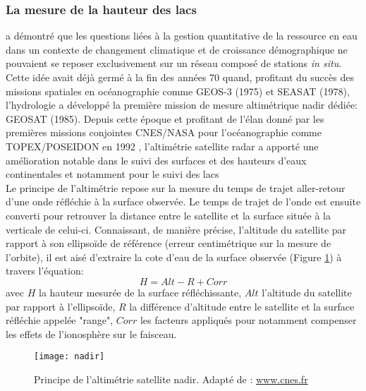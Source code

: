 \subsubsection{{\selectfont La mesure de la hauteur des lacs}}
\citet{alsdorf2003} a démontré que les questions liées à la gestion quantitative de la ressource en eau dans un contexte de changement climatique et de croissance démographique ne pouvaient se reposer exclusivement sur un réseau composé de stations \textit{in situ}. Cette idée avait déjà germé à la fin des années 70 quand, profitant du succès des missions spatiales en océanographie comme GEOS-3 (1975) et SEASAT (1978), l'hydrologie a développé la première mission de mesure altimétrique nadir dédiée: GEOSAT (1985). Depuis cette époque et profitant de l'élan donné par les premières missions conjointes CNES/NASA pour l'océanographie comme TOPEX/POSEIDON en 1992 \citep{fu1994}, l'altimétrie satellite radar a apporté une amélioration notable dans le suivi des surfaces et des hauteurs d'eaux continentales et notamment pour le suivi des lacs \citep{calmant2008,abarca2012}\\

\noindent Le principe de l'altimétrie repose sur la mesure du temps de trajet aller-retour d'une onde réfléchie à la surface observée. Le temps de trajet de l'onde est ensuite converti pour retrouver la distance entre le satellite et la surface située à la verticale de celui-ci. Connaissant, de manière précise, l'altitude du satellite par rapport à son ellipsoïde de référence (erreur centimétrique sur la mesure de l'orbite), il est aisé d'extraire la cote d'eau de la surface observée (Figure \ref{altimetry}) à travers l'équation: 
\begin{equation}
H = Alt - R + Corr
\end{equation}
avec $H$ la hauteur mesurée de la surface réfléchissante, $Alt$ l'altitude du satellite par rapport à l'ellipsoïde, $R$ la différence d'altitude entre le satellite et la surface réfléchie appelée "range", $Corr$ les facteurs appliqués pour notamment compenser les effets de l'ionosphère sur le faisceau.\\ 

\begin{figure}[h!]
 \centering
 \texttt{[image: nadir]}
 \caption{Principe de l'altimétrie satellite nadir. Adapté de : \url{www.cnes.fr}}
  \label{altimetry}
\end{figure}

